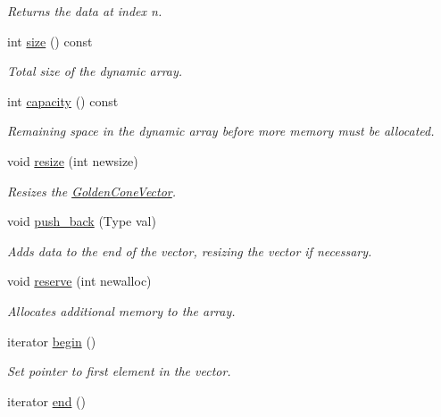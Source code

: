 \begin{DoxyCompactItemize}
\begin{DoxyCompactList}\small\item\em Returns the data at index n. \end{DoxyCompactList}\item 
int \mbox{\hyperlink{class_golden_cone_vector_aa6aaef86e5c3481c1423d37c41c9db33}{size}} () const
\begin{DoxyCompactList}\small\item\em Total size of the dynamic array. \end{DoxyCompactList}\item 
int \mbox{\hyperlink{class_golden_cone_vector_a127f86a04525d935c183195330a85780}{capacity}} () const
\begin{DoxyCompactList}\small\item\em Remaining space in the dynamic array before more memory must be allocated. \end{DoxyCompactList}\item 
void \mbox{\hyperlink{class_golden_cone_vector_a89a420c701f5439a9b418daaede53081}{resize}} (int newsize)
\begin{DoxyCompactList}\small\item\em Resizes the \mbox{\hyperlink{class_golden_cone_vector}{Golden\+Cone\+Vector}}. \end{DoxyCompactList}\item 
void \mbox{\hyperlink{class_golden_cone_vector_ae86125397203f720c7f7a58822363919}{push\+\_\+back}} (Type val)
\begin{DoxyCompactList}\small\item\em Adds data to the end of the vector, resizing the vector if necessary. \end{DoxyCompactList}\item 
void \mbox{\hyperlink{class_golden_cone_vector_aae3c2e2056f3c7d3abfe27fc2fcdfd78}{reserve}} (int newalloc)
\begin{DoxyCompactList}\small\item\em Allocates additional memory to the array. \end{DoxyCompactList}\item 
iterator \mbox{\hyperlink{class_golden_cone_vector_aeb123e6db4c356b66754ee6e2e813935}{begin}} ()
\begin{DoxyCompactList}\small\item\em Set pointer to first element in the vector. \end{DoxyCompactList}\item 
iterator \mbox{\hyperlink{class_golden_cone_vector_af926598b3e8242f1c7f5241383f3c566}{end}} ()

\end{DoxyCompactItemize}
